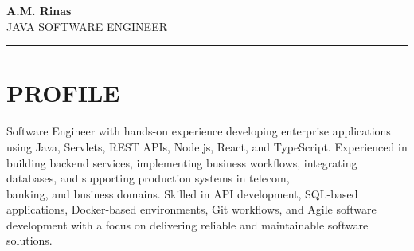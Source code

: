\documentclass[12pt,a4paper]{article}
\begin{document}

\begin{center}
    {\Huge\bfseries\color{headerblue} A.M. Rinas}\\[5pt]
    {\LARGE\color{headerblue} JAVA SOFTWARE ENGINEER}
\end{center}

\vspace{6pt}


\vspace{4pt}
{\color{separatorcolor}\noindent\rule{\textwidth}{0.6pt}}
\vspace{2pt}

\section*{PROFILE}
Software Engineer with hands-on experience developing enterprise applications using Java, Servlets, REST APIs, Node.js, React, and TypeScript. Experienced in building backend services, implementing business workflows, integrating databases, and supporting production systems in telecom, \\banking, and business domains. Skilled in API development, SQL-based applications, Docker-based environments, Git workflows, and Agile software development with a focus on delivering reliable and maintainable software solutions.
\vspace{6pt}
\end{document}
